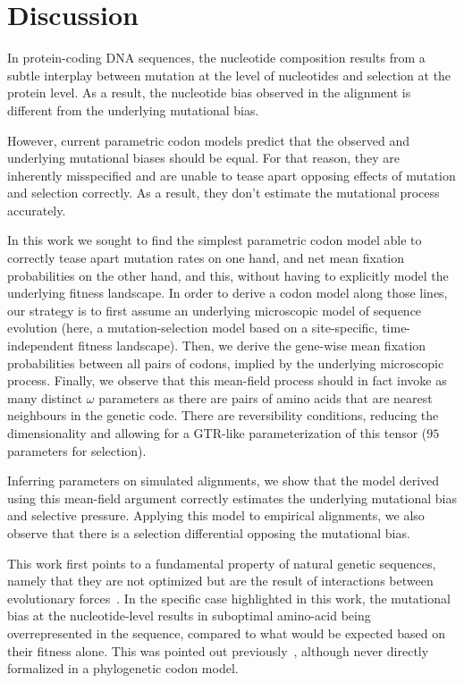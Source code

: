\documentclass{article}
\begin{document}
\section{Discussion}\label{sec:discussion}

In protein-coding {DNA} sequences, the nucleotide composition results from a subtle interplay between mutation at the level of nucleotides and selection at the protein level.
As a result, the nucleotide bias observed in the alignment is different from the underlying mutational bias.

However, current parametric codon models predict that the observed and underlying mutational biases should be equal.
For that reason, they are inherently misspecified and are unable to tease apart opposing effects of mutation and selection correctly.
As a result, they don't estimate the mutational process accurately.

In this work we sought to find the simplest parametric codon model able to correctly tease apart mutation rates on one hand, and net mean fixation probabilities on the other hand, and this, without having to explicitly model the underlying fitness landscape.
In order to derive a codon model along those lines, our strategy is to first assume an underlying microscopic model of sequence evolution (here, a mutation-selection model based on a site-specific, time-independent fitness landscape).
Then, we derive the gene-wise mean fixation probabilities between all pairs of codons, implied by the underlying microscopic process.
Finally, we observe that this mean-field process should in fact invoke as many distinct $\omega$ parameters as there are pairs of amino acids that are nearest neighbours in the genetic code.
There are reversibility conditions, reducing the dimensionality and allowing for a GTR-like parameterization of this tensor ($95$ parameters for selection).

Inferring parameters on simulated alignments, we show that the model derived using this mean-field argument correctly estimates the underlying mutational bias and selective pressure.
Applying this model to empirical alignments, we also observe that there is a selection differential opposing the mutational bias.

This work first points to a fundamental property of natural genetic sequences, namely that they are not optimized but are the result of interactions between evolutionary forces~\citep{Sella2005}.
In the specific case highlighted in this work, the mutational bias at the nucleotide-level results in suboptimal amino-acid being overrepresented in the sequence, compared to what would be expected based on their fitness alone.
This was pointed out previously~\citep{Singer2000}, although never directly formalized in a phylogenetic codon model.
\end{document}
